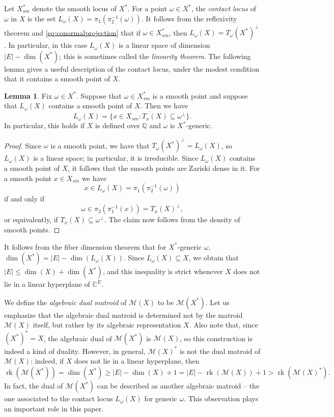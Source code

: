 \documentclass[11pt,a4paper,dvipsnames]{scrartcl}
\theoremstyle{definition}
\newtheorem{lemma}[theorem]{Lemma}
\DeclareMathOperator{\rk}{rk}
\newcommand{\CC}{\mathbb{C}}
\newcommand{\QQ}{\mathbb{Q}}
\newcommand{\algmat}[1]{\mathcal{M}(#1)}
\begin{document}
Let $X^*_{sm}$ denote the smooth locus of $X^*$. For a point $\omega \in X^*$, the \emph{contact locus} of $\omega$ in $X$ is the set $L_\omega(X) = \pi_1(\pi_2^{-1}(\omega))$. It follows from the reflexivity theorem and \cref{eq:conormalprojection} that if $\omega \in X^*_{sm}$, then $L_\omega(X) = {T_\omega(X^*)}^\perp$. In particular, in this case $L_\omega(X)$ is a linear space of dimension $|E| - \dim(X^*)$; this is sometimes called the \emph{linearity theorem}. The following lemma gives a useful description of the contact locus, under the modest condition that it contains a smooth point of $X$.

\begin{lemma}\label{lemma:contactlocusdecription}
    Fix $\omega \in X^*$. Suppose that $\omega \in X^*_{sm}$ is a smooth point and suppose that $L_\omega(X)$ contains a smooth point of $X$. Then we have
    \[L_\omega(X) = \overline{\{x \in X_{sm}: T_x(X) \subseteq \omega^\perp\}}.\]
    In particular, this holds if $X$ is defined over $\QQ$ and $\omega$ is $X^*$-generic.
\end{lemma}
\begin{proof}
    Since $\omega$ is a smooth point, we have that ${T_\omega(X^*)}^\perp = L_\omega(X)$, so $L_\omega(X)$ is a linear space; in particular, it is irreducible. Since $L_\omega(X)$ contains a smooth point of $X$, it follows that the smooth points are Zariski dense in it. For a smooth point $x \in X_{sm}$ we have \[x \in L_\omega(X) = \pi_1(\pi_2^{-1}(\omega))\] if and only if \[\omega \in \pi_2(\pi_1^{-1}(x)) = {T_x(X)}^\perp,\] or equivalently, if $T_x(X) \subseteq \omega^\perp$. The claim now follows from the density of smooth points. 
\end{proof}

It follows from the fiber dimension theorem that for $X^*$-generic $\omega$, $\dim(X^*) = |E| - \dim(L_\omega(X))$. Since $L_\omega(X) \subseteq X$, we obtain that $|E| \leq \dim(X) + \dim (X^*)$, and this inequality is strict whenever $X$ does not lie in a linear hyperplane of $\CC^E$.


We define the \emph{algebraic dual matroid} of $\algmat{X}$ to be $\algmat{X^*}$. Let us emphasize that the algebraic dual matroid is determined not by the matroid $\algmat{X}$ itself, but rather by its algebraic representation $X$. Also note that, since ${(X^*)}^* = X$, the algebraic dual of $\algmat{X^*}$ is $\algmat{X}$, so this construction is indeed a kind of duality.  However, in general, $\algmat{X}^*$ is not the dual matroid of $\algmat{X}$: indeed, if $X$ does not lie in a linear hyperplane, then 
\[\rk(\algmat{X^*}) = \dim(X^*) \geq |E| - \dim(X) + 1 = |E| - \rk(\algmat{X}) + 1 > \rk(\algmat{X}^*).\]
In fact, the dual of $\algmat{X^*}$ can be described as another algebraic matroid -- the one associated to the contact locus $L_\omega(X)$ for generic $\omega$. This observation plays an important role in this paper.  
\end{document}
